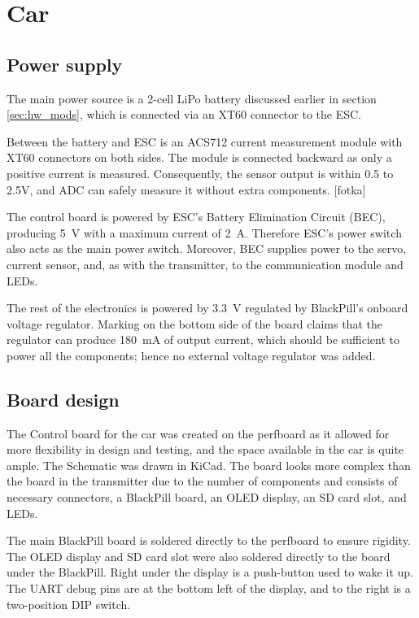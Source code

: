 \section{Car}
\label{sec:real_car}
\subsection{Power supply}
The main power source is a 2-cell LiPo battery discussed earlier in section \ref{sec:hw_mods}, which is connected via an XT60 connector to the ESC.

Between the battery and ESC is an ACS712 current measurement module with XT60 connectors on both sides. The module is connected backward as only a positive current is measured. Consequently, the sensor output is within 0.5 to 2.5V, and ADC can safely measure it without extra components. [\todo fotka]

The control board is powered by ESC's Battery Elimination Circuit (BEC), producing \SI{5}{\V} with a maximum current of \SI{2}{\A}. Therefore ESC's power switch also acts as the main power switch. Moreover, BEC supplies power to the servo, current sensor, and, as with the transmitter, to the communication module and LEDs.

The rest of the electronics is powered by \SI{3.3}{\V} regulated by BlackPill's onboard voltage regulator. Marking on the bottom side of the board claims that the regulator can produce \SI{180}{\mA} of output current, which should be sufficient to power all the components; hence no external voltage regulator was added.

\subsection{Board design}
The Control board for the car was created on the perfboard as it allowed for more flexibility in design and testing, and the space available in the car is quite ample. The Schematic was drawn in KiCad. The board looks more complex than the board in the transmitter due to the number of components and consists of necessary connectors, a BlackPill board, an OLED display, an SD card slot, and LEDs.

The main BlackPill board is soldered directly to the perfboard to ensure rigidity. The OLED display and SD card slot were also soldered directly to the board under the BlackPill. Right under the display is a push-button used to wake it up. The UART debug pins are at the bottom left of the display, and to the right is a two-position DIP switch.

